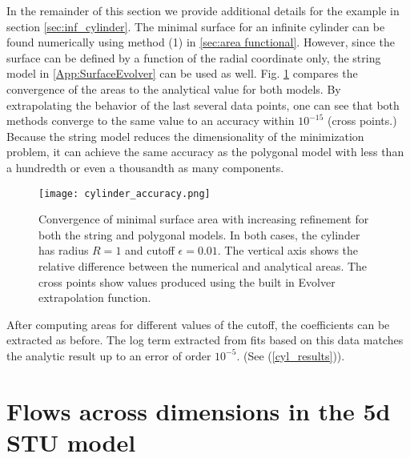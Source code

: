 \documentclass[11 pt]{article}
\begin{document}
In the remainder of this section we provide additional details for the example in section \ref{sec:inf_cylinder}. The minimal surface for an infinite cylinder can be found numerically using method (1) in \ref{sec:area functional}. However, since the surface can be defined by a function of the radial coordinate only, the string model in \ref{App:SurfaceEvolver} can be used as well. Fig. \ref{fig:cylinder_accuracy} compares the convergence of the areas to the analytical value for both models. By extrapolating the behavior of the last several data points, one can see that both methods converge to the same value to an accuracy within $10^{-15}$ (cross points.) Because the string model reduces the dimensionality of the minimization problem, it can achieve the same accuracy as the polygonal model with less than a hundredth or even a thousandth as many components.
    \begin{figure}
        \centering
        \texttt{[image: cylinder\_accuracy.png]}
        \caption{Convergence of minimal surface area with increasing refinement for both the string and polygonal models. In both cases, the cylinder has radius $R=1$ and cutoff $\epsilon=0.01$. The vertical axis shows the relative difference between the numerical and analytical areas. The cross points show values produced using the built in Evolver extrapolation function.}
        \label{fig:cylinder_accuracy}
    \end{figure}
After computing areas for different values of the cutoff, the coefficients can be extracted as before. The log term extracted from fits based on this data matches the analytic result up to an error of order $10^{-5}$. (See (\ref{cyl_results})).

\section{Flows across dimensions in the 5d STU model}\label{App:SugraSolutions}
\end{document}
